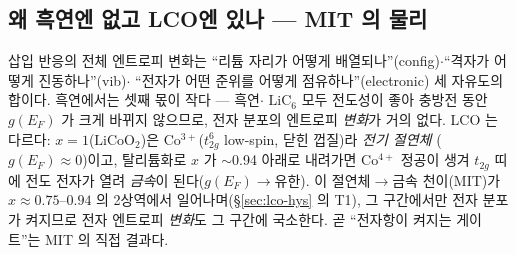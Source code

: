 \documentclass[11pt,a4paper]{article}
\begin{document}
\subsection{왜 흑연엔 없고 LCO엔 있나 — MIT 의 물리}\label{sec:lco-why}
삽입 반응의 전체 엔트로피 변화는 ``리튬 자리가 어떻게 배열되나''(config)$\cdot$``격자가 어떻게 진동하나''(vib)$\cdot$
``전자가 어떤 준위를 어떻게 점유하나''(electronic) 세 자유도의 합이다. 흑연에서는 셋째 몫이 작다 — 흑연$\cdot$
$\mathrm{LiC_6}$ 모두 전도성이 좋아 충방전 동안 $g(E_F)$ 가 크게 바뀌지 않으므로, 전자 분포의 엔트로피 \emph{변화}가
거의 없다. LCO 는 다르다: $x{=}1$($\mathrm{LiCoO_2}$)은 Co$^{3+}$($t_{2g}^6$ low-spin, 닫힌 껍질)라 \emph{전기 절연체}
($g(E_F)\!\approx\!0$)이고, 탈리튬화로 $x$ 가 $\sim$0.94 아래로 내려가면 Co$^{4+}$ 정공이 생겨 $t_{2g}$ 띠에 전도 전자가
열려 \emph{금속}이 된다($g(E_F)\!\to\!$유한)\cite{menetrier1999,motohashi2009}. 이 절연체$\to$금속 천이(MIT)가 $x\approx0.75$--$0.94$
의 2상역에서 일어나며(\S\ref{sec:lco-hys} 의 T1), 그 구간에서만 전자 분포가 켜지므로 전자 엔트로피 \emph{변화}도 그
구간에 국소한다. 곧 ``전자항이 켜지는 게이트''는 MIT 의 직접 결과다.
\end{document}
